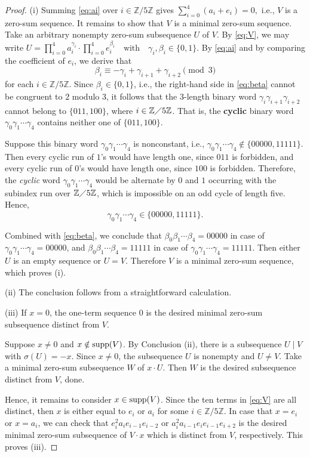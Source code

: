 \documentclass[a4paper, 12pt]{article}
\begin{document}
\begin{proof}
(i) Summing \eqref{eq:ai} over $i\in\mathbb Z/5\mathbb Z$ gives
$\sum_{i=0}^{4}(a_i+e_i)=0,$ i.e., $V$ is a zero-sum sequence. It remains to show that $V$ is a minimal zero-sum sequence. Take an arbitrary nonempty zero-sum subsequence $U$ of $V$. By \eqref{eq:V}, we may write
$U=\prod_{i=0}^{4}a_i^{\gamma_i} \cdot \prod_{i=0}^{4} e_i^{\beta_i}
 \quad\text{with}\quad
 \gamma_i,\beta_i\in\{0,1\}$.  By \eqref{eq:ai} and by
comparing the coefficient of $e_i$, we derive that
\begin{equation}\label{eq:beta}
 \beta_i\equiv -\gamma_i+\gamma_{i+1}+\gamma_{i+2}
 \pmod 3
\end{equation} for each $i\in\mathbb Z/5\mathbb Z$.
Since $\beta_i\in\{0,1\}$, i.e., the right-hand side in \eqref{eq:beta} cannot be congruent to $2$ modulo $3$, it follows that the $3$-length binary word
$\gamma_i\gamma_{i+1}\gamma_{i+2}$ cannot belong to $\{011, 100\}$, where $i\in \mathbb{Z}\diagup 5\mathbb{Z}$. That is,
the {\bf cyclic} binary word $\gamma_0\gamma_1\cdots\gamma_4$ contains
neither one of $\{011, 100\}$.

Suppose this binary word $\gamma_0\gamma_1\cdots\gamma_4$ is nonconstant, i.e., $\gamma_0\gamma_1\cdots\gamma_4\notin \{00000,11111\}.$ Then every cyclic run of $1$'s would
have length one, since $011$ is forbidden, and every cyclic run of
$0$'s would have length one, since $100$ is forbidden.  Therefore, the {\sl cyclic} word $\gamma_0\gamma_1\cdots\gamma_4$
would be alternate by $0$ and $1$ occurring with the subindex run over $\mathbb{Z}\diagup 5\mathbb{Z}$, which is impossible on an odd cycle of length
five.  Hence, $$\gamma_0\gamma_1\cdots\gamma_4\in \{00000,11111\}.$$

Combined with \eqref{eq:beta}, we conclude that $\beta_0\beta_1\cdots\beta_4=00000$ in case of $\gamma_0\gamma_1\cdots\gamma_4=00000$,  and $\beta_0\beta_1\cdots\beta_4=11111$ in case of $\gamma_0\gamma_1\cdots\gamma_4=11111$. Then either
$U$ is an empty sequence or $U=V$.  Therefore $V$ is a minimal zero-sum sequence, which proves (i).

(ii) The conclusion follows from a  straightforward calculation.


(iii) If $x=0$, the one-term sequence $0$ is the desired minimal zero-sum subsequence distinct from $V$.

Suppose $x\neq 0$ and $x\notin{\rm supp}(V)$.  By
Conclusion (ii), there is a subsequence $U\mid V$ with
$\sigma(U)=-x$.  Since $x\neq 0$, the subsequence $U$ is nonempty and $U\neq V$.
Take a minimal zero-sum subsequence $W$ of $x\cdot U$. Then $W$ is the desired subsequence distinct from $V$, done.

Hence, it remains to consider $x\in{\rm supp}(V)$.
Since the ten terms in \eqref{eq:V}
are all distinct, then $x$ is either equal to $e_i$ or $a_i$ for some $i\in\mathbb Z/5\mathbb Z$.  In case that $x=e_i$ or $x=a_i$, we can check that $e_i^2a_ie_{i-1}e_{i-2}$ or $a_i^2a_{i-1}e_ie_{i-1}e_{i+2}$ is the desired minimal zero-sum subsequence of $V\cdot x$ which is distinct from $V$, respectively. This proves (iii).
\end{proof}
\end{document}
